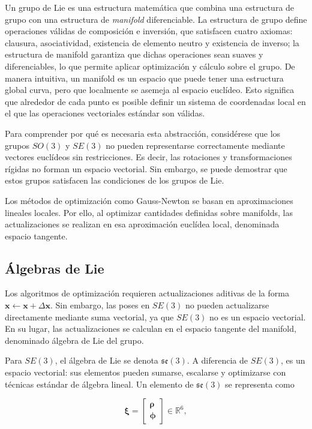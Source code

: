 Un grupo de Lie es una estructura matemática que combina una estructura de grupo con una estructura de \textit{manifold} diferenciable. La estructura de grupo define operaciones válidas de composición e inversión, que satisfacen cuatro axiomas: clausura, asociatividad, existencia de elemento neutro y existencia de inverso; la estructura de manifold garantiza que dichas operaciones sean suaves y diferenciables, lo que permite aplicar optimización y cálculo sobre el grupo. De manera intuitiva, un manifold es un espacio que puede tener una estructura global curva, pero que localmente se asemeja al espacio euclídeo. Esto significa que alrededor de cada punto es posible definir un sistema de coordenadas local en el que las operaciones vectoriales estándar son válidas.

Para comprender por qué es necesaria esta abstracción, considérese que los grupos $SO(3)$ y $SE(3)$ no pueden representarse correctamente mediante vectores euclídeos sin restricciones. Es decir, las rotaciones y transformaciones rígidas no forman un espacio vectorial. Sin embargo, se puede demostrar que estos grupos satisfacen las condiciones de los grupos de Lie.

Los métodos de optimización como Gauss-Newton se basan en aproximaciones lineales locales. Por ello, al optimizar cantidades definidas sobre manifolds, las actualizaciones se realizan en esa aproximación euclídea local, denominada espacio tangente.

\subsection{Álgebras de Lie}

Los algoritmos de optimización requieren actualizaciones aditivas de la forma $\mathbf{x} \leftarrow \mathbf{x} + \Delta\mathbf{x}$. Sin embargo, las poses en $SE(3)$ no pueden actualizarse directamente mediante suma vectorial, ya que $SE(3)$ no es un espacio vectorial. En su lugar, las actualizaciones se calculan en el espacio tangente del manifold, denominado álgebra de Lie del grupo.

Para $SE(3)$, el álgebra de Lie se denota $\mathfrak{se}(3)$. A diferencia de $SE(3)$, es un espacio vectorial: sus elementos pueden sumarse, escalarse y optimizarse con técnicas estándar de álgebra lineal. Un elemento de $\mathfrak{se}(3)$ se representa como

\[
\boldsymbol{\xi} =
\begin{bmatrix}
\boldsymbol{\rho}\\
\boldsymbol{\phi}
\end{bmatrix}
\in\mathbb{R}^6,
\]

